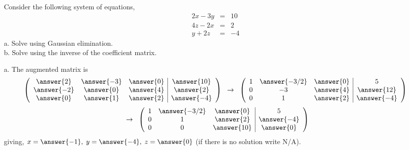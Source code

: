 \documentclass{ximera}
\begin{document}
\begin{exercise}
Consider the following system of equations,
\begin{eqnarray*}
2x-3y&=& 10\\
4z -2x &=& 2\\
y+2z &=& -4
\end{eqnarray*}
a. Solve using Gaussian elimination.\\
b. Solve using the inverse of the coefficient matrix. 

\begin{prompt}
a. The augmented matrix is
\[  \left(\begin{array}{ccc|c}
  \answer{2} & \answer{-3} & \answer{0} & \answer{10}  \\
  \answer{-2} & \answer{0} & \answer{4} & \answer{2}  \\
  \answer{0} & \answer{1} & \answer{2} & \answer{-4}  
\end{array}\right)
\hspace{.2cm} \rightarrow \hspace{.2cm}
\left(\begin{array}{ccc|c}
  1 & \answer{-3/2} & \answer{0} & 5  \\
  0 &-3 & \answer{4} & \answer{12}  \\
  0 & 1 & \answer{2} & \answer{-4}
\end{array}\right)
\]
\[
\hspace{.2cm} \rightarrow \hspace{.2cm}
\left(\begin{array}{ccc|c}
  1 & \answer{-3/2} & \answer{0} & 5  \\
  0 &1 & \answer{2} & \answer{-4}  \\
  0 & 0 & \answer{10} & \answer{0}
\end{array}\right)
\]
giving, $x = \answer{-1}, \hspace{.1cm} y= \answer{-4}, \hspace{.1cm} z= \answer{0}$ (if there is no solution write N/A). 


\end{prompt}
\end{exercise}
\end{document}
